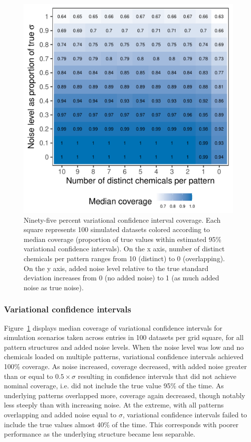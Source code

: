 \begin{figure}[!htbp]
\caption{Ninety-five percent variational confidence interval coverage. Each square represents 100 simulated datasets colored according to median coverage (proportion of true values within estimated 95\% variational confidence intervals). On the x axis, number of distinct chemicals per pattern ranges from 10 (distinct) to 0 (overlapping). On the y axis, added noise level relative to the true standard deviation increases from 0 (no added noise) to 1 (as much added noise as true noise).}
\label{heatmap}
\centering
\includegraphics[scale = 0.7]{./figures/coverage_heat.pdf}
\end{figure}

\subsubsection{Variational confidence intervals}
Figure~\ref{heatmap} displays median coverage of variational confidence intervals for simulation scenarios taken across entries in 100 datasets per grid square, for all pattern structures and added noise levels. When the noise level was low and no chemicals loaded on multiple patterns, variational confidence intervals achieved 100\% coverage. As noise increased, coverage decreased, with added noise greater than or equal to $0.5 \times \sigma$ resulting in confidence intervals that did not achieve nominal coverage, i.e. did not include the true value 95\% of the time. As underlying patterns overlapped more, coverage again decreased, though notably less steeply than with increasing noise. At the extreme, with all patterns overlapping and added noise equal to $\sigma$, variational confidence intervals failed to include the true values almost 40\% of the time. This corresponds with poorer performance as the underlying structure became less separable. 

